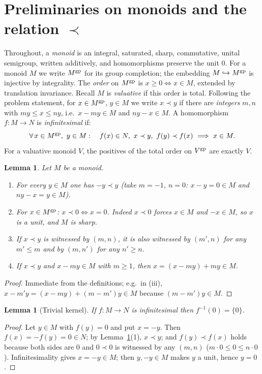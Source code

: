 \documentclass[11pt]{amsart}
\theoremstyle{plain}
\newtheorem{lemma}[theorem]{Lemma}
\theoremstyle{remark}
\theoremstyle{definition}
\numberwithin{equation}{section}
\begin{document}
\section{Preliminaries on monoids and the relation \texorpdfstring{$\prec$}{prec}}

Throughout, a \emph{monoid} is an integral, saturated, sharp, commutative,
unital semigroup, written additively, and homomorphisms preserve the unit
$0$.  For a monoid $M$ we write $M^{\rm gp}$ for its group completion; the
embedding $M\hookrightarrow M^{\rm gp}$ is injective by integrality.  The
\emph{order} on $M^{\rm gp}$ is $x\ge 0\iff x\in M$, extended by
translation invariance.  Recall $M$ is \emph{valuative} if this order is
total.  Following the problem statement, for
$x\in M^{\rm gp}$, $y\in M$ we write $x\prec y$ if there are
\emph{integers} $m,n$ with $my\le x\le ny$, i.e.\ $x-my\in M$ and
$ny-x\in M$.  A homomorphism $f\colon M\to N$ is \emph{infinitesimal} if:
\[
\forall\, x\in M^{\rm gp},\ y\in M:\quad
f(x)\in N,\ x\prec y,\ f(y)\prec f(x)\ \Longrightarrow\ x\in M .
\]
For a valuative monoid $V$, the positives of the total order on $V^{\rm gp}$
are exactly $V$.

\begin{lemma}\label{lem:prec-basic}
Let $M$ be a monoid.
\begin{enumerate}
\item For every $y\in M$ one has $-y\prec y$ (take $m=-1$, $n=0$:
$x-y=0\in M$ and $ny-x=y\in M$).
\item For $x\in M^{\rm gp}$: $x\prec 0\iff x=0$.  Indeed $x\prec 0$ forces
$x\in M$ and $-x\in M$, so $x$ is a unit, and $M$ is sharp.
\item If $x\prec y$ is witnessed by $(m,n)$, it is also witnessed by
$(m',n)$ for any $m'\le m$ and by $(m,n')$ for any $n'\ge n$.
\item If $x\prec y$ and $x-my\in M$ with $m\ge 1$, then
$x=(x-my)+my\in M$.
\end{enumerate}
\end{lemma}
\begin{proof}
Immediate from the definitions; e.g.\ in (iii),
$x-m'y=(x-my)+(m-m')y\in M$ because $(m-m')y\in M$.
\end{proof}

\begin{lemma}[Trivial kernel]\label{lem:kernel}
If $f\colon M\to N$ is infinitesimal then $f^{-1}(0)=\{0\}$.
\end{lemma}
\begin{proof}
Let $y\in M$ with $f(y)=0$ and put $x=-y$.  Then $f(x)=-f(y)=0\in N$;
by Lemma~\ref{lem:prec-basic}(1), $x\prec y$; and $f(y)\prec f(x)$ holds
because both sides are $0$ and $0\prec0$ is witnessed by any $(m,n)$
($m\cdot0\le 0\le n\cdot0$).  Infinitesimality gives $x=-y\in M$; then
$y,-y\in M$ makes $y$ a unit, hence $y=0$.
\end{proof}
\end{document}
